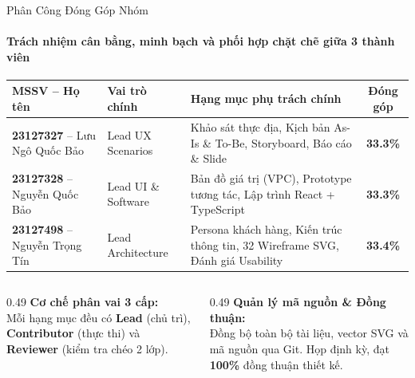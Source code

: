 \begin{frame}{Phân Công Đóng Góp Nhóm}
  \framesubtitle{\color{white!90}\textbf{Trách nhiệm cân bằng, minh bạch và phối hợp chặt chẽ giữa 3 thành viên}}

  {\small
  \begin{tabularx}{\textwidth}{l l X c}
    \toprule
    \rowcolor{PetcarePrimary!12}
    \textbf{MSSV -- Họ tên} & \textbf{Vai trò chính} & \textbf{Hạng mục phụ trách chính} & \textbf{Đóng góp} \\
    \midrule
    \textbf{23127327} -- Lưu Ngô Quốc Bảo & Lead UX Scenarios & Khảo sát thực địa, Kịch bản As-Is \& To-Be, Storyboard, Báo cáo \& Slide & \textbf{33.3\%} \\
    \addlinespace[1.5mm]
    \textbf{23127328} -- Nguyễn Quốc Bảo & Lead UI \& Software & Bản đồ giá trị (VPC), Prototype tương tác, Lập trình React + TypeScript & \textbf{33.3\%} \\
    \addlinespace[1.5mm]
    \textbf{23127498} -- Nguyễn Trọng Tín & Lead Architecture & Persona khách hàng, Kiến trúc thông tin, 32 Wireframe SVG, Đánh giá Usability & \textbf{33.4\%} \\
    \bottomrule
  \end{tabularx}}

  \vspace{3mm}
  \begin{columns}[T]
    \begin{column}{0.49\textwidth}
      {\color{PetcarePrimary}\textbf{\small Cơ chế phân vai 3 cấp:}}\\[1mm]
      \small Mỗi hạng mục đều có \textbf{Lead} (chủ trì), \textbf{Contributor} (thực thi) và \textbf{Reviewer} (kiểm tra chéo 2 lớp).
    \end{column}

    \begin{column}{0.49\textwidth}
      {\color{PetcarePrimary}\textbf{\small Quản lý mã nguồn \& Đồng thuận:}}\\[1mm]
      \small Đồng bộ toàn bộ tài liệu, vector SVG và mã nguồn qua Git. Họp định kỳ, đạt \textbf{100\%} đồng thuận thiết kế.
    \end{column}
  \end{columns}
\end{frame}
